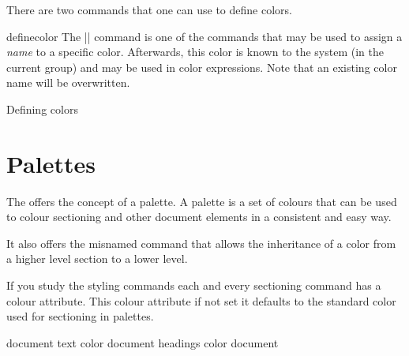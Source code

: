 There are two commands that one can use to define colors.

\begin{docCommand}{definecolor}{ }
The |\definecolor| command is one of the commands that may be used to assign a \textit{name} to a specific color. Afterwards, this color is known to the system (in the current group) and may be used in color expressions. Note that an existing color name will be overwritten.
\end{docCommand} 

\begin{texexample}{Defining colors}{}

\color{myblack}\lorem
\end{texexample}

\section{Palettes}

The  offers the concept of a palette. A palette is a set of colours that can be used to colour sectioning and other document elements in a consistent and easy way.

It also offers the misnamed command \cmd{\inherit} that allows the inheritance of a color from a higher level section to a lower level.

If you study the styling commands each and every sectioning command has a colour attribute. This colour attribute if not set it defaults to the standard color used for sectioning in palettes.


document text color
document headings color
document 











